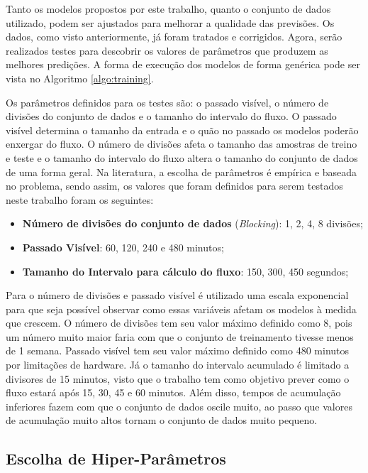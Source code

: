 Tanto os modelos propostos por este trabalho, quanto o conjunto de dados utilizado, podem ser ajustados para melhorar a qualidade das previsões. Os dados, como visto anteriormente, já foram tratados e corrigidos. Agora, serão realizados testes para descobrir os valores de parâmetros que produzem as melhores predições. A forma de execução dos modelos de forma genérica pode ser vista no Algoritmo \ref{algo:training}.

Os parâmetros definidos para os testes são: o passado visível, o número de divisões do conjunto de dados e o tamanho do intervalo do fluxo. O passado visível determina o tamanho da entrada e o quão no passado os modelos poderão enxergar do fluxo. O número de divisões afeta o tamanho das amostras de treino e teste e o tamanho do intervalo do fluxo altera o tamanho do conjunto de dados de uma forma geral. Na literatura, a escolha de parâmetros é empírica e baseada no problema, sendo assim, os valores que foram definidos para serem testados neste trabalho foram os seguintes:

\begin{itemize}
    \item \textbf{Número de divisões do conjunto de dados} (\textit{Blocking}): 1, 2, 4, 8 divisões;
    \item \textbf{Passado Visível}: 60, 120, 240 e 480 minutos;
    \item \textbf{Tamanho do Intervalo para cálculo do fluxo}: 150, 300, 450 segundos;
\end{itemize}

Para o número de divisões e passado visível é utilizado uma escala exponencial para que seja possível observar como essas variáveis afetam os modelos à medida que crescem. O número de divisões tem seu valor máximo definido como 8, pois um número muito maior faria com que o conjunto de treinamento tivesse menos de 1 semana. Passado visível tem seu valor máximo definido como 480 minutos por limitações de hardware. Já o tamanho do intervalo acumulado é limitado a divisores de 15 minutos, visto que o trabalho tem como objetivo prever como o fluxo estará após 15, 30, 45 e 60 minutos. Além disso, tempos de acumulação inferiores fazem com que o conjunto de dados oscile muito, ao passo que valores de acumulação muito altos tornam o conjunto de dados muito pequeno.

\subsection{Escolha de Hiper-Parâmetros}

